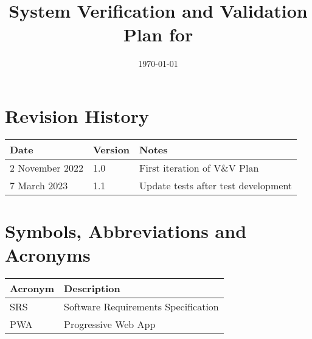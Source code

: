 \documentclass[12pt, titlepage]{article}
\begin{document}
\title{System Verification and Validation Plan for \progname{}} 
\author{\authname}
\date{\today}
	
\maketitle


\section{Revision History}

\begin{tabularx}{\textwidth}{p{3.2cm}p{1.8cm}X}
\toprule {\bf Date} & {\bf Version} & {\bf Notes}\\
\midrule
2 November 2022 & 1.0 & First iteration of V\&V Plan\\
7 March 2023 & 1.1 & Update tests after test development\\
\bottomrule
\end{tabularx}

\newpage

\tableofcontents

\listoftables
{}


\newpage

\section{Symbols, Abbreviations and Acronyms}

\renewcommand{\arraystretch}{1.2}
\begin{tabular}{l l} 
  \toprule		
  \textbf{Acronym} & \textbf{Description}\\
  \midrule 
  SRS & Software Requirements Specification\\
  PWA & Progressive Web App\\
  \bottomrule
\end{tabular}\\



\newpage

\end{document}
